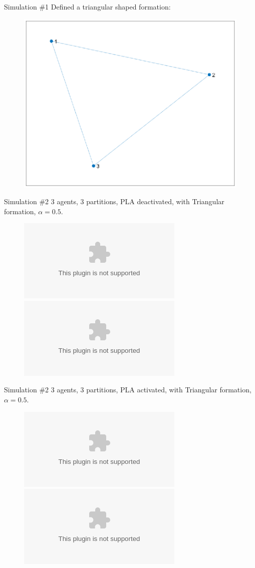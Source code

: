 \documentclass[t]{beamer}
\begin{document}
\subsection[Simulations]{}
\begin{frame}[label=formsim1]{Simulation \#1}
Defined a triangular shaped formation:
\begin{figure}
\centering
\includegraphics[scale=0.6]{sim/sim-formationshape.eps}
\end{figure}
\end{frame}
\begin{frame}[label=plasim2]{Simulation \#2}
3 agents, 3 partitions, PLA deactivated, with Triangular formation, $\alpha = 0.5$.
\begin{figure}
\centering
\includegraphics<1>[scale=0.6]{sim/sim1-3agents-3partitions-noPLA.eps}
\includegraphics<2>[scale=0.6]{sim/sim3-3agents-3partitions-noPLA-formation.eps}
\end{figure}
\end{frame}
\begin{frame}[label=plasim3]{Simulation \#2}
3 agents, 3 partitions, PLA activated, with Triangular formation, $\alpha = 0.5$.
\begin{figure}
\centering
\includegraphics<1>[scale=0.6]{sim/sim2-3agents-3partitions-PLA.eps}
\includegraphics<2>[scale=0.6]{sim/sim4-3agents-3partitions-PLA-formation.eps}
\end{figure}
\end{frame}

\end{document}
